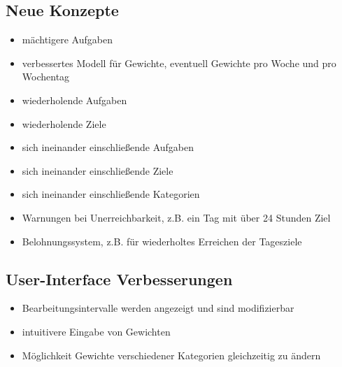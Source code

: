 \documentclass[10pt,a4paper]{article}
\begin{document}
\subsection{Neue Konzepte}
\begin{itemize}
	\item mächtigere Aufgaben
	\item verbessertes Modell für Gewichte, eventuell Gewichte pro Woche und pro Wochentag
	\item wiederholende Aufgaben
	\item wiederholende Ziele
	\item sich ineinander einschließende Aufgaben
	\item sich ineinander einschließende Ziele
	\item sich ineinander einschließende Kategorien
	\item Warnungen bei Unerreichbarkeit, z.B. ein Tag mit über 24 Stunden Ziel
	\item Belohnungssystem, z.B. für wiederholtes Erreichen der Tagesziele
\end{itemize}
\subsection{User-Interface Verbesserungen}
\begin{itemize}
	\item Bearbeitungsintervalle werden angezeigt und sind modifizierbar
	\item intuitivere Eingabe von Gewichten
	\item Möglichkeit Gewichte verschiedener Kategorien gleichzeitig zu ändern
\end{itemize}
\end{document}

